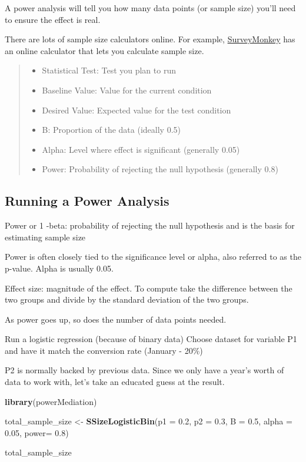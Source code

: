 \documentclass[]{article}
\newenvironment{Shaded}{\begin{snugshade}}{\end{snugshade}}
\newcommand{\KeywordTok}[1]{\textcolor[rgb]{0.13,0.29,0.53}{\textbf{#1}}}
\newcommand{\DataTypeTok}[1]{\textcolor[rgb]{0.13,0.29,0.53}{#1}}
\newcommand{\FloatTok}[1]{\textcolor[rgb]{0.00,0.00,0.81}{#1}}
\newcommand{\StringTok}[1]{\textcolor[rgb]{0.31,0.60,0.02}{#1}}
\newcommand{\NormalTok}[1]{#1}
\providecommand{\tightlist}{%
  \setlength{\itemsep}{0pt}\setlength{\parskip}{0pt}}
\begin{document}
A power analysis will tell you how many data points (or sample size)
you'll need to ensure the effect is real.

There are lots of sample size calculators online. For example,
\href{https://www.surveymonkey.com/mp/sample-size-calculator/}{SurveyMonkey}
has an online calculator that lets you calculate sample size.

\begin{quote}
\begin{itemize}
\tightlist
\item
  Statistical Test: Test you plan to run
\item
  Baseline Value: Value for the current condition
\item
  Desired Value: Expected value for the test condition
\item
  B: Proportion of the data (ideally 0.5)
\item
  Alpha: Level where effect is significant (generally 0.05)
\item
  Power: Probability of rejecting the null hypothesis (generally 0.8)
\end{itemize}
\end{quote}

\subsection{Running a Power Analysis}\label{running-a-power-analysis}

Power or 1 -beta: probability of rejecting the null hypothesis and is
the basis for estimating sample size

Power is often closely tied to the significance level or alpha, also
referred to as the p-value. Alpha is usually 0.05.

Effect size: magnitude of the effect. To compute take the difference
between the two groups and divide by the standard deviation of the two
groups.

As power goes up, so does the number of data points needed.

Run a logistic regression (because of binary data) Choose dataset for
variable P1 and have it match the conversion rate (January - 20\%)

P2 is normally backed by previous data. Since we only have a year's
worth of data to work with, let's take an educated guess at the result.

\begin{Shaded}
\begin{Highlighting}[]
\KeywordTok{library}\NormalTok{(powerMediation)}

\NormalTok{total_sample_size <-}\StringTok{ }\KeywordTok{SSizeLogisticBin}\NormalTok{(}\DataTypeTok{p1 =} \FloatTok{0.2}\NormalTok{,}
                                      \DataTypeTok{p2 =} \FloatTok{0.3}\NormalTok{,}
                                      \DataTypeTok{B =} \FloatTok{0.5}\NormalTok{,}
                                      \DataTypeTok{alpha =} \FloatTok{0.05}\NormalTok{,}
                                      \DataTypeTok{power=} \FloatTok{0.8}\NormalTok{)}

\NormalTok{total_sample_size}
\end{Highlighting}
\end{Shaded}
\end{document}
